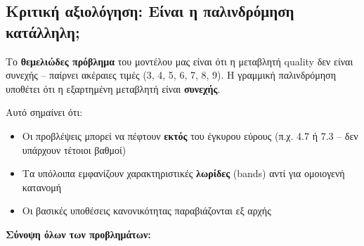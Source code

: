 \documentclass[12pt,a4paper]{article}
\begin{document}
\subsection{Κριτική αξιολόγηση: Είναι η παλινδρόμηση κατάλληλη;}

\begin{importantbox}
Το \textbf{θεμελιώδες πρόβλημα} του μοντέλου μας είναι ότι η μεταβλητή quality δεν είναι συνεχής -- παίρνει ακέραιες τιμές (3, 4, 5, 6, 7, 8, 9). Η γραμμική παλινδρόμηση υποθέτει ότι η εξαρτημένη μεταβλητή είναι \textbf{συνεχής}.

Αυτό σημαίνει ότι:
\begin{itemize}
    \item Οι προβλέψεις μπορεί να πέφτουν \textbf{εκτός} του έγκυρου εύρους (π.χ. 4.7 ή 7.3 -- δεν υπάρχουν τέτοιοι βαθμοί)
    \item Τα υπόλοιπα εμφανίζουν χαρακτηριστικές \textbf{λωρίδες} (bands) αντί για ομοιογενή κατανομή
    \item Οι βασικές υποθέσεις κανονικότητας παραβιάζονται εξ αρχής
\end{itemize}
\end{importantbox}

\textbf{Σύνοψη όλων των προβλημάτων:}
\end{document}
